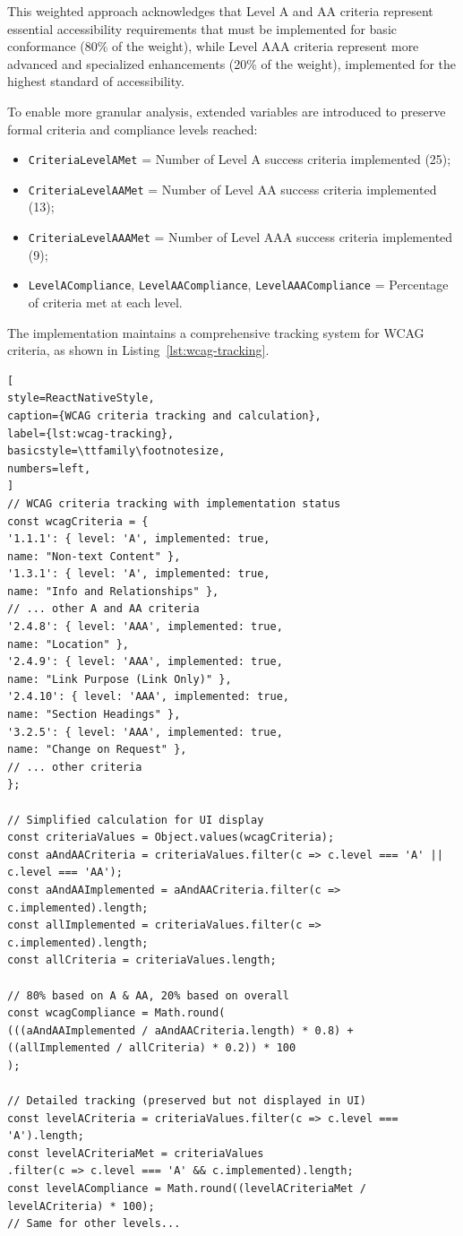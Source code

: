 This weighted approach acknowledges that Level A and AA criteria represent essential accessibility requirements that must be implemented for basic conformance (80\% of the weight), while Level AAA criteria represent more advanced and specialized enhancements (20\% of the weight), implemented for the highest standard of accessibility.

To enable more granular analysis, extended variables are introduced to preserve formal criteria and compliance levels reached:
\begin{itemize}
\item \texttt{CriteriaLevelAMet} = Number of Level A success criteria implemented (25);
\item \texttt{CriteriaLevelAAMet} = Number of Level AA success criteria implemented (13);
\item \texttt{CriteriaLevelAAAMet} = Number of Level AAA success criteria implemented (9);
\item \texttt{LevelACompliance}, \texttt{LevelAACompliance}, \texttt{LevelAAACompliance} = Percentage of criteria met at each level.
\end{itemize}

The implementation maintains a comprehensive tracking system for WCAG criteria, as shown in Listing~\ref{lst:wcag-tracking}.
\begin{lstlisting}[
style=ReactNativeStyle,
caption={WCAG criteria tracking and calculation},
label={lst:wcag-tracking},
basicstyle=\ttfamily\footnotesize,
numbers=left,
]
// WCAG criteria tracking with implementation status
const wcagCriteria = {
'1.1.1': { level: 'A', implemented: true,
name: "Non-text Content" },
'1.3.1': { level: 'A', implemented: true,
name: "Info and Relationships" },
// ... other A and AA criteria
'2.4.8': { level: 'AAA', implemented: true,
name: "Location" },
'2.4.9': { level: 'AAA', implemented: true,
name: "Link Purpose (Link Only)" },
'2.4.10': { level: 'AAA', implemented: true,
name: "Section Headings" },
'3.2.5': { level: 'AAA', implemented: true,
name: "Change on Request" },
// ... other criteria
};

// Simplified calculation for UI display
const criteriaValues = Object.values(wcagCriteria);
const aAndAACriteria = criteriaValues.filter(c => c.level === 'A' || c.level === 'AA');
const aAndAAImplemented = aAndAACriteria.filter(c => c.implemented).length;
const allImplemented = criteriaValues.filter(c => c.implemented).length;
const allCriteria = criteriaValues.length;

// 80% based on A & AA, 20% based on overall
const wcagCompliance = Math.round(
(((aAndAAImplemented / aAndAACriteria.length) * 0.8) +
((allImplemented / allCriteria) * 0.2)) * 100
);

// Detailed tracking (preserved but not displayed in UI)
const levelACriteria = criteriaValues.filter(c => c.level === 'A').length;
const levelACriteriaMet = criteriaValues
.filter(c => c.level === 'A' && c.implemented).length;
const levelACompliance = Math.round((levelACriteriaMet / levelACriteria) * 100);
// Same for other levels...

\end{lstlisting}

